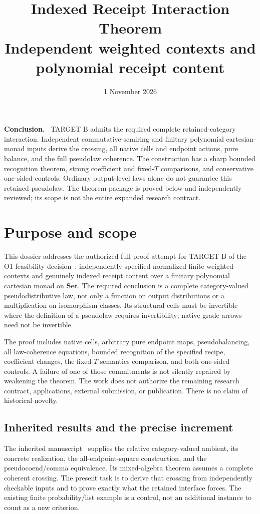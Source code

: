 \documentclass[11pt,a4paper]{article}
\title{Indexed Receipt Interaction Theorem\\[5pt]
\large Independent weighted contexts and polynomial receipt content}
\author{}
\date{1 November 2026}
\theoremstyle{definition}
\newcommand{\Set}{\mathbf{Set}}
\newcommand{\status}[1]{\par\textbf{#1.}\ }
\begin{document}
\maketitle
\vspace{-1em}

\status{Conclusion}
TARGET B admits the required complete retained-category interaction. Independent
commutative-semiring and finitary polynomial cartesian-monad inputs derive the
crossing, all native cells and endpoint actions, pure balance, and the full
pseudolaw coherence. The construction has a sharp bounded recognition theorem,
strong coefficient and fixed-$T$ comparisons, and conservative one-sided
controls. Ordinary output-level laws alone do not guarantee this retained
pseudolaw. The theorem package is proved below and independently reviewed;
its scope is not the entire expanded research contract.

\section{Purpose and scope}
\label{sec:scope}

This dossier addresses the authorized full proof attempt for TARGET B of the
O1 feasibility decision~\cite{Feasibility}: independently specified normalized
finite weighted contexts and genuinely indexed receipt content over a finitary
polynomial cartesian monad on $\Set$. The required conclusion is a complete
category-valued pseudodistributive law, not only a function on output
distributions or a multiplication on isomorphism classes. Its structural cells
must be invertible where the definition of a pseudolaw requires invertibility;
native grade arrows need not be invertible.

The proof includes native cells, arbitrary pure endpoint maps,
pseudobalancing, all law-coherence equations, bounded recognition of the
specified recipe, coefficient changes, the fixed-$T$ semantics comparison,
and both one-sided controls. A failure of one of those commitments is not
silently repaired by weakening the theorem. The work does not authorize the
remaining research contract, applications, external submission, or publication.
There is no claim of historical novelty.

\subsection{Inherited results and the precise increment}

The inherited manuscript~\cite{Unified} supplies the relative category-valued
ambient, its concrete realization, the all-endpoint-square construction, and
the pseudocoend/comma equivalence. Its mixed-algebra theorem assumes a complete
coherent crossing. The present task is to derive that crossing from independently
checkable inputs and to prove exactly what the retained interface forces.
The existing finite probability/list example is a control, not an additional
instance to count as a new criterion.
\end{document}
